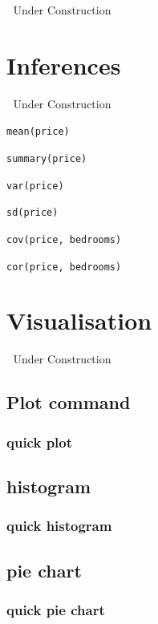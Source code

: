 \documentclass[
]{book}
\begin{document}
🚧 Under Construction 🚧

\hypertarget{inferences}{%
\chapter{Inferences}\label{inferences}}

🚧 Under Construction 🚧

\texttt{mean(price)}

\texttt{summary(price)}

\texttt{var(price)}

\texttt{sd(price)}

\texttt{cov(price,\ bedrooms)}

\texttt{cor(price,\ bedrooms)}

\hypertarget{visualisation}{%
\chapter{Visualisation}\label{visualisation}}

🚧 Under Construction 🚧

\hypertarget{plot-command}{%
\section{Plot command}\label{plot-command}}

\hypertarget{quick-plot}{%
\subsection{quick plot}\label{quick-plot}}

\hypertarget{histogram}{%
\section{histogram}\label{histogram}}

\hypertarget{quick-histogram}{%
\subsection{quick histogram}\label{quick-histogram}}

\hypertarget{pie-chart}{%
\section{pie chart}\label{pie-chart}}

\hypertarget{quick-pie-chart}{%
\subsection{quick pie chart}\label{quick-pie-chart}}
\end{document}
